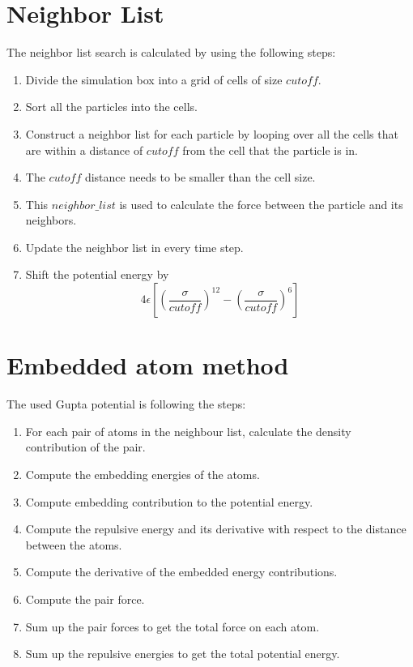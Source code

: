 \section{Neighbor List}
    The neighbor list search is calculated by using the following steps:
        \begin{enumerate}
            \item Divide the simulation box into a grid of cells of size $cutoff$.
            \item Sort all the particles into the cells.
            \item Construct a neighbor list for each particle by looping over all the cells that are within a distance of $cutoff$ from the cell that the particle is in.
            \item The $cutoff$ distance needs to be smaller than the cell size.
            \item This $neighbor\_list$ is used to calculate the force between the particle and its neighbors.
            \item Update the neighbor list in every time step.
            \item Shift the potential energy by
            \begin{equation}
                4 \epsilon [\left(\frac{\sigma}{cutoff}\right)^{12} - \left(\frac{\sigma}{cutoff}\right)^{6}]
            \end{equation}
        \end{enumerate}


\section{Embedded atom method}
The used Gupta potential is following the steps:
    \begin{enumerate}
        \item For each pair of atoms in the neighbour list, calculate the density contribution of the pair.
        \item Compute the embedding energies of the atoms.
        \item Compute embedding contribution to the potential energy.
        \item Compute the repulsive energy and its derivative with respect to the distance between the atoms.
        \item Compute the derivative of the embedded energy contributions.
        \item Compute the pair force.
        \item Sum up the pair forces to get the total force on each atom.
        \item Sum up the repulsive energies to get the total potential energy.
        \end{enumerate}


